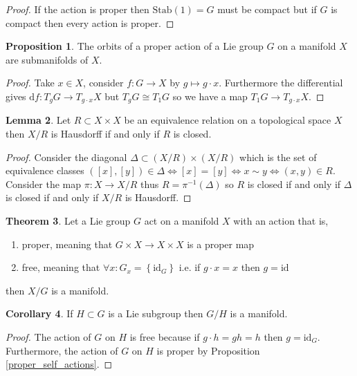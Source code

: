 \documentclass[12pt]{extarticle}
\newcommand{\id}{\mathrm{id}}
\theoremstyle{definition}
\newtheorem{theorem}{Theorem}[section]
\newtheorem{lemma}[theorem]{Lemma}
\newtheorem{proposition}[theorem]{Proposition}
\newtheorem{corollary}[theorem]{Corollary}
\begin{document}
\begin{proof}
If the action is proper then $\mathrm{Stab}(1) = G$ must be compact but if $G$ is compact then every action is proper. 
\end{proof}

\begin{proposition}
The orbits of a proper action of a Lie group $G$ on a manifold $X$ are submanifolds of $X$.
\end{proposition}

\begin{proof}
Take $x \in X$, consider $f : G \to X$ by $g \mapsto g \cdot x$. Furthermore the differential gives $\mathrm{d}f : T_g G \to T_{g\cdot x} X$ but $T_g G \cong T_1 G$ so we have a map $T_1 G \to T_{g \cdot x} X$. 
\end{proof}

\begin{lemma}
Let $R \subset X \times X$ be an equivalence relation on a topological space $X$ then $X / R$ is Hausdorff if and only if $R$ is closed. 
\end{lemma}

\begin{proof}
Consider the diagonal $\Delta \subset (X / R) \times (X / R)$ which is the set of equivalence classes $([x], [y]) \in \Delta \iff [x] = [y] \iff x \sim y \iff (x, y) \in R$. Consider the map $\pi : X \to X / R$ thus $R = \pi^{-1}(\Delta)$ so $R$ is closed if and only if $\Delta$ is closed if and only if $X/R$ is Hausdorff. 
\end{proof}


\begin{theorem}
Let a Lie group $G$ act on a manifold $X$ with an action that is,
\begin{enumerate}
\item proper, meaning that $G \times X \to X \times X$ is a proper map
\item free, meaning that $\forall x : G_x = \left\{ \id_G \right\}$ i.e. if $g \cdot x = x$ then $g = \id$
\end{enumerate}
then $X / G$ is a manifold. 
\end{theorem}

\begin{corollary}
If $H \subset G$ is a Lie subgroup then $G / H$ is a manifold.
\end{corollary}

\begin{proof}
The action of $G$ on $H$ is free because if $g \cdot h = gh = h$ then $g = \id_G$. Furthermore, the action of $G$ on $H$ is proper by Proposition \ref{proper_self_actions}.
\end{proof}
\end{document}
